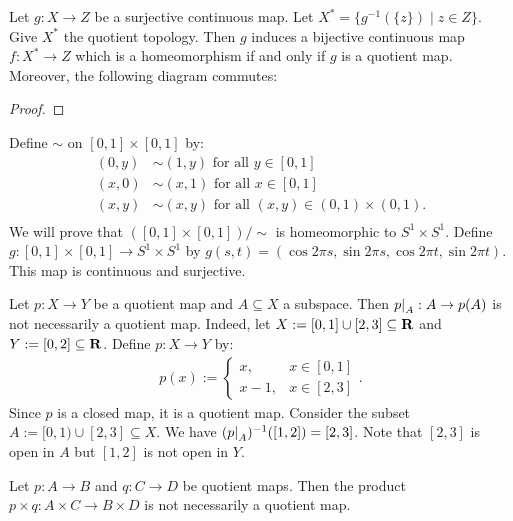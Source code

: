 \begin{corollary}
    Let $g:X \rightarrow Z$ be a surjective continuous map. Let $X^\ast = \{g^{-1}(\{z\}) \mid z \in Z\}$. Give $X^\ast$ the quotient topology. Then $g$ induces a bijective continuous map $f:X^\ast \rightarrow Z$ which is a homeomorphism if and only if $g$ is a quotient map. Moreover, the following diagram commutes:
    \begin{center}
    \end{center}

\end{corollary}
    {\color{red} \begin{proof}
        
    \end{proof}}

\begin{example}
    Define $\sim$ on $[0,1] \times [0,1]$ by:
        \begin{equation*}
        \begin{split}
            (0,y) &\sim (1,y) \text{ for all }y \in [0,1]\\
            (x,0) &\sim (x,1) \text{ for all }x \in [0,1]\\
            (x,y) &\sim (x,y) \text{ for all }(x,y) \in (0,1) \times (0,1).\\
        \end{split}
        \end{equation*}
    We will prove that $([0,1] \times [0,1])/\sim$ is homeomorphic to $S^1 \times S^1$. Define $g:[0,1] \times [0,1] \rightarrow S^1 \times S^1$ by $g(s,t) = (\cos 2\pi s, \sin 2\pi s, \cos 2 \pi t, \sin 2 \pi t)$. This map is continuous and surjective.
\end{example}

\begin{example}
    Let $p:X \rightarrow Y$ be a quotient map and $A \subseteq X$ a subspace. Then $\restr{p}{A} :A \rightarrow p(A)$ is not necessarily a quotient map. Indeed, let $X:=[0,1] \cup [2,3] \subseteq \mathbf{R}$ and $Y := [0,2] \subseteq \mathbf{R}$. Define $p:X \rightarrow Y$ by:
        \begin{equation*}
        \begin{split}
            p(x):=\begin{cases}
            x, & x \in [0,1] \\
            x-1, & x \in [2,3]
            \end{cases}.
        \end{split}
        \end{equation*}
    Since $p$ is a closed map, it is a quotient map. Consider the subset $A := [0,1) \cup [2,3] \subseteq X$. We have $(\restr{p}{A})^{-1}([1,2]) = [2,3]$. Note that $[2,3]$ is open in $A$ but $[1,2]$ is not open in $Y$.
\end{example}

\begin{example}
    Let $p:A \rightarrow B$ and $q:C \rightarrow D$ be quotient maps. Then the product $p \times q:A \times C \rightarrow B \times D$ is not necessarily a quotient map.
\end{example}
